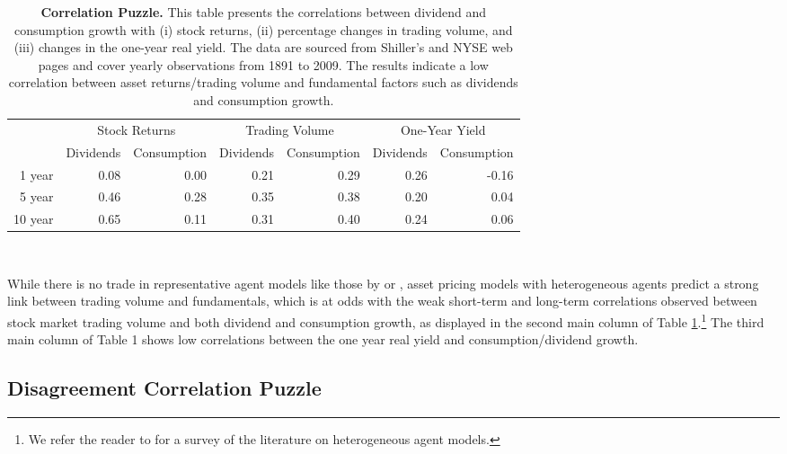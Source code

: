 \documentclass[preprint,11pt,authoryear]{elsarticle}
\theoremstyle{plain}
\begin{document}
 \begin{table}[htbp]
 \centering
  \begin{tabular}{r|rr|rr|rr}
   \toprule
   & \multicolumn{2}{c}{Stock Returns} & \multicolumn{2}{c}{Trading Volume} & \multicolumn{2}{c}{One-Year Yield} \\
   & Dividends & Consumption &Dividends & Consumption  &Dividends & Consumption \\
   \hline
    1 year & 0.08 & 0.00 & 0.21 & 0.29 & 0.26 & -0.16 \\
    5 year & 0.46 & 0.28 & 0.35 & 0.38 & 0.20 & 0.04 \\
    10 year & 0.65 & 0.11 & 0.31 & 0.40 & 0.24 & 0.06 \\
    \bottomrule
 \end{tabular} \\ \vspace{0.2cm}
  \caption{{\bf Correlation Puzzle.} This table presents the correlations between dividend and consumption growth with (i) stock returns, (ii) percentage changes in trading volume, and (iii) changes in the one-year real yield. The data are sourced from Shiller's and NYSE web pages and cover yearly observations from 1891 to 2009. The results indicate a low correlation between asset returns/trading volume and fundamental factors such as dividends and consumption growth.}
 \label{table:CorrelationPuzzle}
 \end{table}
 While there is no trade in representative agent models like those by \cite{campbell-cochrane:99} or \cite{bansal-yaron:04}, asset pricing models with heterogeneous agents predict a strong link between trading volume and fundamentals, which is at odds with the weak short-term and long-term correlations observed between stock market trading volume and both dividend and consumption growth, as displayed in the second main column of Table \ref{table:CorrelationPuzzle}.\footnote{We refer the reader to \cite{panageas:2020} for a survey of the literature on heterogeneous agent models.} The third main column of Table 1 shows low correlations between the one year real yield and consumption/dividend growth. %


\subsection{Disagreement Correlation Puzzle} \label{sec:dis}
\end{document}

